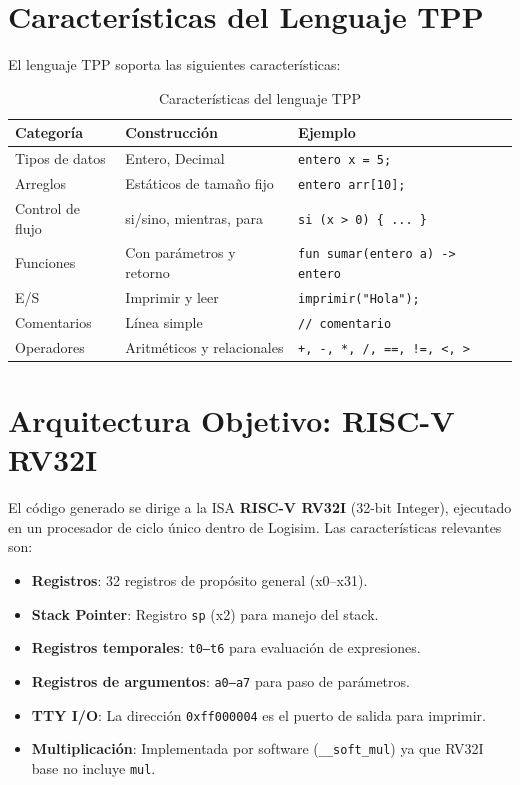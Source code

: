 \section{Características del Lenguaje TPP}

El lenguaje TPP soporta las siguientes características:

\begin{table}[H]
\centering
\begin{tabular}{lll}
\toprule
\textbf{Categoría} & \textbf{Construcción} & \textbf{Ejemplo} \\
\midrule
Tipos de datos & Entero, Decimal & \texttt{entero x = 5;} \\
Arreglos & Estáticos de tamaño fijo & \texttt{entero arr[10];} \\
Control de flujo & si/sino, mientras, para & \texttt{si (x > 0) \{ ... \}} \\
Funciones & Con parámetros y retorno & \texttt{fun sumar(entero a) -> entero} \\
E/S & Imprimir y leer & \texttt{imprimir("Hola");} \\
Comentarios & Línea simple & \texttt{// comentario} \\
Operadores & Aritméticos y relacionales & \texttt{+, -, *, /, ==, !=, <, >} \\
\bottomrule
\end{tabular}
\caption{Características del lenguaje TPP}
\label{tab:caracteristicas}
\end{table}

\section{Arquitectura Objetivo: RISC-V RV32I}

El código generado se dirige a la ISA \textbf{RISC-V RV32I} (32-bit Integer), ejecutado en un procesador de ciclo único dentro de Logisim. Las características relevantes son:

\begin{itemize}
    \item \textbf{Registros}: 32 registros de propósito general (x0--x31).
    \item \textbf{Stack Pointer}: Registro \texttt{sp} (x2) para manejo del stack.
    \item \textbf{Registros temporales}: \texttt{t0--t6} para evaluación de expresiones.
    \item \textbf{Registros de argumentos}: \texttt{a0--a7} para paso de parámetros.
    \item \textbf{TTY I/O}: La dirección \texttt{0xff000004} es el puerto de salida para imprimir.
    \item \textbf{Multiplicación}: Implementada por software (\texttt{\_\_soft\_mul}) ya que RV32I base no incluye \texttt{mul}.
\end{itemize}

